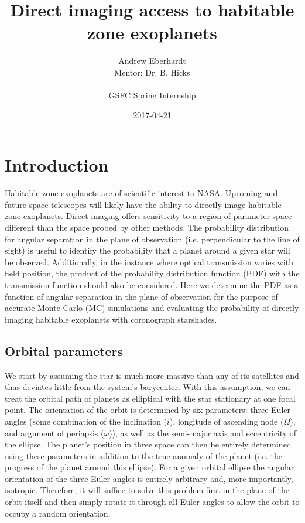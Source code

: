 \documentclass{article}
\title{Direct imaging access to habitable zone exoplanets}
\date{2017-04-21}
\author{Andrew Eberhardt\\ Mentor: Dr. B. Hicks \\ \\ GSFC Spring Internship}
\begin{document}
	\maketitle
	\newpage
	
	\section{Introduction}
		Habitable zone exoplanets are of scientific interest to NASA. Upcoming and future space telescopes will likely have the ability to directly image habitable zone exoplanets. Direct imaging offers sensitivity to a region of parameter space different than the space probed by other methods. The probability distribution for angular separation in the plane of observation (i.e. perpendicular to the line of sight) is useful to identify the probability that a planet around a given star will be observed. Additionally, in the instance where optical transmission varies with field position, the product of the probability distribution function (PDF) with the transmission function should also be considered. Here we determine the PDF as a function of angular separation in the plane of observation for the purpose of accurate Monte Carlo (MC) simulations and evaluating the probability of directly imaging habitable exoplanets with coronograph starshades. 
	
	\subsection{Orbital parameters}
	We start by assuming the star is much more massive than any of its satellites and thus deviates little from the system's barycenter. With this assumption, we can treat the orbital path of  planets as elliptical with the star stationary at one focal point. The orientation of the orbit is determined by six parameters: three Euler angles (some combination of the inclination ($i$), longitude of ascending node ($\Omega$), and argument of periapsis ($\omega$)), as well as the semi-major axis and eccentricity of the ellipse. The planet's position in three space can then be entirely determined using these parameters in addition to the true anomaly of the planet (i.e. the progress of the planet around this ellipse). For a given orbital ellipse the angular orientation of the three Euler angles is entirely arbitrary and, more importantly, isotropic. Therefore, it will suffice to solve this problem first in the plane of the orbit itself and then simply rotate it through all Euler angles to allow the orbit to occupy a random orientation. 
	
\end{document}
